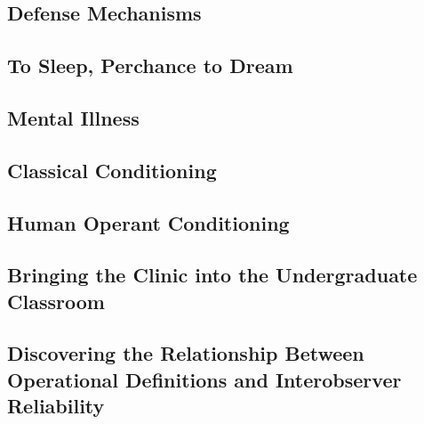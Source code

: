 \begin{refsection}
\begin{appendices}
\subsection{Defense Mechanisms}
\label{defensemechanisms}

\label{app: defensemechanism}


\subsection{To Sleep, Perchance to Dream}
\label{tosleepperchancetodream}

\label{app: tosleep}


\subsection{Mental Illness}
\label{mentalillness}

\label{app: mentalillness}


\subsection{Classical Conditioning}
\label{classicalconditioning}

\label{app: classicalconditioning}


\subsection{Human Operant Conditioning}
\label{humanoperantconditioning}

\label{app: humanoperantconditioning}


\subsection{Bringing the Clinic into the Undergraduate Classroom}
\label{bringingtheclinicintotheundergraduateclassroom}

\label{app: theclinic}


\subsection{Discovering the Relationship Between Operational Definitions and Interobserver Reliability}
\label{discoveringtherelationshipbetweenoperationaldefinitionsandinterobserverreliability}


\end{appendices}
\end{refsection}
